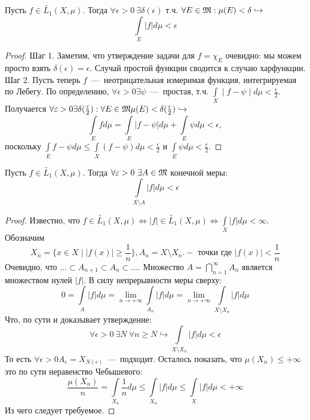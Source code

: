 \begin{theorem}
    Пусть $f \in \widetilde{L_1}(X, \mu)$. Тогда $\forall \epsilon > 0 \ \exists \delta(\epsilon)$ т.ч. $\forall E \in \mathfrak{M} : \mu(E) < \delta \hookrightarrow$ \[\int\limits_{E} |f|d\mu < \epsilon\]
\end{theorem}
\begin{proof}
    Шаг 1. Заметим, что утверждение задачи для $f = \chi_E$ очевидно: мы можем просто взять $\delta(\epsilon) = \epsilon$. Случай простой функции сводится к случаю харфункции. \\
    Шаг 2. Пусть теперь $f$~---~неотрицательная измеримая функция, интегрируемая по Лебегу. По определению, $\forall \epsilon > 0 \exists \psi$~---~простая, т.ч. $\int\limits_X \mid f - \psi \mid d\mu < \frac{\epsilon}{2}$. Получается $\forall \varepsilon > 0  \exists \delta(\frac{\varepsilon}{2}): \forall E \in \mathfrak{M}  \mu(E) < \delta(\frac{\varepsilon}{2}) \hookrightarrow$ \[\int\limits_E fd\mu = \int\limits_{E} |f - \psi|  d\mu + \int\limits_E \psi d\mu < \epsilon,\]
     поскольку $\int\limits_{E}f - \psi d\mu \leq \int\limits_{X}(f - \psi)d\mu < \frac{\epsilon}{2}$ и $\int\limits_{E}\psi d\mu < \frac{\epsilon}{2}$.
\end{proof}

\begin{proposition}
    Пусть $f \in \widetilde{L_1}(X, \mu)$. Тогда $\forall \varepsilon > 0 \ \exists A \in \mathfrak{M}$ конечной меры: \[\int\limits_{X \setminus A} |f|d\mu < \epsilon\]
\end{proposition}
\begin{proof}
    Известно, что $f \in \widetilde{L_1}(X, \mu) \Longleftrightarrow |f| \in \widetilde{L_1}(X, \mu) \Longleftrightarrow \int\limits_X |f|d\mu < \infty$. Обозначим \[X_n = \{x \in X \mid |f(x)| \geq \frac{1}{n}\}, A_n = X\setminus X_n. - \text{ точки где } |f(x)| < \frac{1}{n}\]
    Очевидно, что $\ldots \subset A_{n + 1} \subset A_n \subset \ldots$. Множество $A = \bigcap\limits_{n = 1}^\infty A_n$ является множеством нулей $|f|$. В силу непрерывности меры сверху: \[0 = \int\limits_A |f|d\mu = \lim\limits_{n \rightarrow +\infty} \int\limits_{A_n} |f|d\mu = \lim\limits_{n \rightarrow +\infty} \int\limits_{X \setminus X_n} |f|d\mu\]
    Что, по сути и доказывает утверждение: \[\forall \epsilon > 0  \ \exists N \ \forall n \geq N \hookrightarrow \int\limits_{X \setminus X_n} |f|d\mu < \epsilon\]
    То есть $\forall \epsilon > 0 A_\epsilon = X_{N(\epsilon)}$~---~подходит. Осталось показать, что $\mu(X_n) \leq +\infty$ это по сути неравенство Чебышевого: \[\frac{\mu(X_n)}{n} = \int\limits_{X_n} \frac{1}{n}d\mu \leq \int\limits_{X_n} |f|d\mu \leq \int\limits_{X} |f|d\mu < +\infty\]
    Из чего следует требуемое.
\end{proof}

